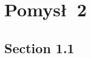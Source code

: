 \documentclass[module]{subfiles}
\begin{document}
\clearpage

\part{Pomys\l\ 2}

\chapter{Section 1.1}

\lipsum[1]
\end{document}
